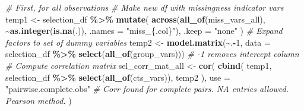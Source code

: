 \documentclass[
]{article}
\newenvironment{Shaded}{\begin{snugshade}}{\end{snugshade}}
\newcommand{\AttributeTok}[1]{\textcolor[rgb]{0.13,0.29,0.53}{#1}}
\newcommand{\CommentTok}[1]{\textcolor[rgb]{0.56,0.35,0.01}{\textit{#1}}}
\newcommand{\DecValTok}[1]{\textcolor[rgb]{0.00,0.00,0.81}{#1}}
\newcommand{\FunctionTok}[1]{\textcolor[rgb]{0.13,0.29,0.53}{\textbf{#1}}}
\newcommand{\NormalTok}[1]{#1}
\newcommand{\OtherTok}[1]{\textcolor[rgb]{0.56,0.35,0.01}{#1}}
\newcommand{\SpecialCharTok}[1]{\textcolor[rgb]{0.81,0.36,0.00}{\textbf{#1}}}
\newcommand{\StringTok}[1]{\textcolor[rgb]{0.31,0.60,0.02}{#1}}
\newcounter{none} %
\begin{document}
\begin{Shaded}
\begin{Highlighting}[]
\CommentTok{\# First, for all observations}
\CommentTok{\# Make new df with missingness indicator vars}
\NormalTok{temp1 }\OtherTok{\textless{}{-}}\NormalTok{ selection\_df }\SpecialCharTok{\%\textgreater{}\%} 
  \FunctionTok{mutate}\NormalTok{(}
    \FunctionTok{across}\NormalTok{(}\FunctionTok{all\_of}\NormalTok{(miss\_vars\_all), }
           \SpecialCharTok{\textasciitilde{}}\FunctionTok{as.integer}\NormalTok{(}\FunctionTok{is.na}\NormalTok{(.)),}
           \AttributeTok{.names =} \StringTok{"miss\_\{.col\}"}\NormalTok{),}
    \AttributeTok{.keep =} \StringTok{"none"}
\NormalTok{  )}
\CommentTok{\# Expand factors to set of dummy variables}
\NormalTok{temp2 }\OtherTok{\textless{}{-}} \FunctionTok{model.matrix}\NormalTok{(}\SpecialCharTok{\textasciitilde{}}\NormalTok{.}\SpecialCharTok{{-}}\DecValTok{1}\NormalTok{, }\AttributeTok{data =}\NormalTok{ selection\_df }\SpecialCharTok{\%\textgreater{}\%} \FunctionTok{select}\NormalTok{(}\FunctionTok{all\_of}\NormalTok{(group\_vars))) }\CommentTok{\# {-}1 removes intercept column}
\CommentTok{\# Compute correlation matrix}
\NormalTok{sel\_corr\_mat\_all }\OtherTok{\textless{}{-}} \FunctionTok{cor}\NormalTok{(}
  \FunctionTok{cbind}\NormalTok{(}
\NormalTok{    temp1, }
\NormalTok{    selection\_df }\SpecialCharTok{\%\textgreater{}\%} \FunctionTok{select}\NormalTok{(}\FunctionTok{all\_of}\NormalTok{(cts\_vars)), }
\NormalTok{    temp2}
\NormalTok{    ),}
  \AttributeTok{use =} \StringTok{"pairwise.complete.obs"} \CommentTok{\# Corr found for complete pairs. NA entries allowed. Pearson method.}
\NormalTok{)}


\end{Highlighting}
\end{Shaded}
\end{document}
